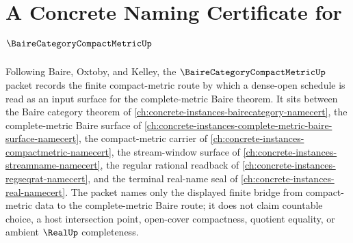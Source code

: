 \chapter{A Concrete Naming Certificate for $\BaireCategoryCompactMetricUp$}
\label{ch:concrete-instances-baire-category-compact-metric-namecert}

Following Baire, Oxtoby, and Kelley, the $\BaireCategoryCompactMetricUp$ packet records the finite compact-metric route by which a dense-open schedule is read as an input surface for the complete-metric Baire theorem. It sits between the Baire category theorem of \autoref{ch:concrete-instances-bairecategory-namecert}, the complete-metric Baire surface of \autoref{ch:concrete-instances-complete-metric-baire-surface-namecert}, the compact-metric carrier of \autoref{ch:concrete-instances-compactmetric-namecert}, the stream-window surface of \autoref{ch:concrete-instances-streamname-namecert}, the regular rational readback of \autoref{ch:concrete-instances-regseqrat-namecert}, and the terminal real-name seal of \autoref{ch:concrete-instances-real-namecert}. The packet names only the displayed finite bridge from compact-metric data to the complete-metric Baire route; it does not claim countable choice, a host intersection point, open-cover compactness, quotient equality, or ambient $\RealUp$ completeness.

